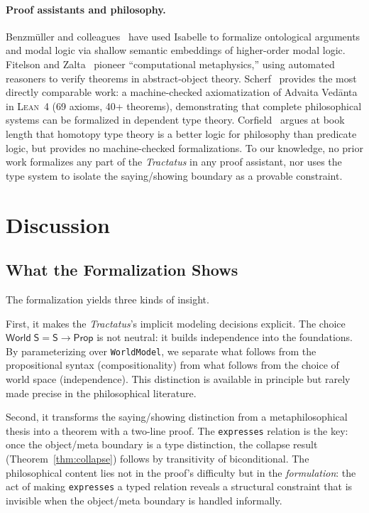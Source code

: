 \documentclass[10pt, letterpaper]{article}
\theoremstyle{definition}
\theoremstyle{remark}
\newcommand{\Sach}{\mathsf{S}}
\newcommand{\World}{\mathsf{World}}
\newcommand{\Prop}{\mathsf{Prop}}
\newcommand{\Lean}{\textsc{Lean}}
\begin{document}
\paragraph{Proof assistants and philosophy.}
Benzm\"uller and colleagues~\cite{benzmuller2017} have used
Isabelle to formalize ontological arguments and modal logic
via shallow semantic embeddings of higher-order modal logic.
Fitelson and Zalta~\cite{fitelson2007} pioneer ``computational
metaphysics,'' using automated reasoners to verify theorems
in abstract-object theory.
Scherf~\cite{scherf2025} provides the most directly comparable
work: a machine-checked axiomatization of Advaita Ved\=anta in
\Lean~4 (69 axioms, 40+ theorems), demonstrating that complete
philosophical systems can be formalized in dependent type
theory.
Corfield~\cite{corfield2020} argues at book length that
homotopy type theory is a better logic for philosophy than
predicate logic, but provides no machine-checked formalizations.
To our knowledge, no prior work formalizes any part of the
\emph{Tractatus} in any proof assistant, nor uses the type
system to isolate the saying/showing boundary as a provable
constraint.

\section{Discussion}
\label{sec:discussion}

\subsection{What the Formalization Shows}
\label{sec:shows}

The formalization yields three kinds of insight.

First, it makes the \emph{Tractatus}'s implicit modeling
decisions explicit.  The choice $\World\;\Sach = \Sach \to
\Prop$ is not neutral: it builds independence into the
foundations.  By parameterizing over \texttt{WorldModel}, we
separate what follows from the propositional syntax (compositionality)
from what follows from the choice of world space (independence).
This distinction is available in principle but rarely made
precise in the philosophical literature.

Second, it transforms the saying/showing distinction from a
metaphilosophical thesis into a theorem with a two-line proof.
The \texttt{expresses} relation is the key: once the
object/meta boundary is a type distinction, the collapse result
(Theorem~\ref{thm:collapse}) follows by transitivity of
biconditional.  The philosophical content lies not in the proof's
difficulty but in the \emph{formulation}: the act of making
\texttt{expresses} a typed relation reveals a structural
constraint that is invisible when the object/meta boundary is
handled informally.
\end{document}
